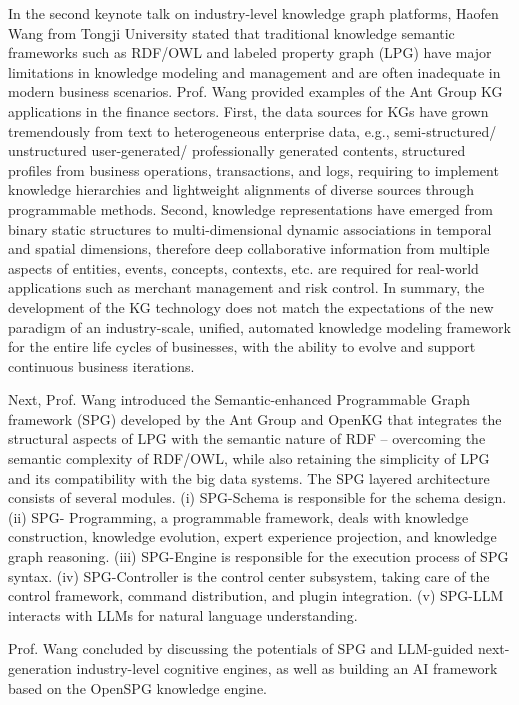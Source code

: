 \documentclass{sig-alternate-10pt}
\begin{document}
In the second keynote talk on industry-level knowledge graph platforms, Haofen Wang from Tongji University stated that traditional knowledge semantic frameworks such as RDF/OWL and labeled property graph (LPG) have major limitations in knowledge modeling and management and are often inadequate in modern business scenarios. Prof. Wang provided examples of the Ant Group KG applications in the finance sectors. First, the data sources for KGs have grown tremendously from text to heterogeneous enterprise data, e.g.,  semi-structured/ unstructured user-generated/ professionally generated contents, structured profiles from business operations, transactions, and logs, requiring to implement knowledge hierarchies and
lightweight alignments of diverse sources through programmable methods. Second, knowledge
representations have emerged from binary static structures to multi-dimensional dynamic
associations in temporal and spatial dimensions, therefore deep collaborative information from multiple
aspects of entities, events, concepts, contexts, etc. are required for real-world applications such as merchant management and risk control. In summary, the development of the KG technology does not match the expectations of the new paradigm of an industry-scale, unified, automated knowledge modeling framework for the entire life cycles of businesses, with the ability to evolve and support continuous business iterations.


Next, Prof. Wang introduced the Semantic-enhanced Programmable Graph framework (SPG) developed by the Ant Group and OpenKG \cite{spg} that integrates the structural aspects of LPG with the semantic nature of RDF -- overcoming the semantic complexity of RDF/OWL, while also retaining the simplicity of LPG and
its compatibility with the big data systems. The SPG layered architecture consists of several modules. (i) SPG-Schema is responsible for the schema design. (ii) SPG- Programming, a programmable framework, deals with knowledge construction, knowledge evolution, expert experience projection, and knowledge graph reasoning. (iii)  SPG-Engine is responsible for the execution process of SPG syntax. (iv) SPG-Controller is the control center subsystem, taking care of the control framework, command distribution, and plugin integration. (v) SPG-LLM interacts with LLMs for natural language understanding. 


Prof. Wang concluded by discussing the potentials of SPG and LLM-guided next-generation industry-level cognitive engines, as well as building an AI framework based on the OpenSPG knowledge engine.
\end{document}
